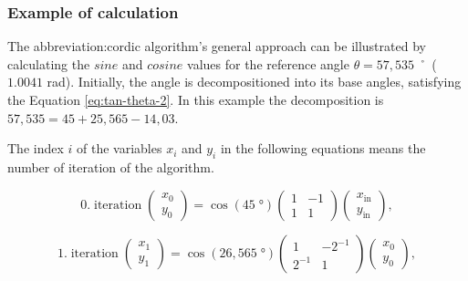 \documentclass[a4paper, twoside, 11pt]{article}
\begin{document}
        \subsubsection{Example of calculation}\label{subsubsec:example-of-calculation}
            The \gls{abbreviation:cordic} algorithm's general approach can be illustrated by calculating the $sine$ and $cosine$ values for the reference angle $\theta = 57,535\;˚$ ($1.0041$ rad). Initially, the angle is decompositioned into its base angles, satisfying the Equation \ref{eq:tan-theta-2}. In this example the decomposition is $57,535 = 45 + 25,565 -14,03$.\par
            The index $i$ of the variables $x_i$ and $y_i$ in the following equations means the number of iteration of the algorithm.

            \begin{equation}
                0.\;\text{iteration}\;
                \begin{pmatrix}
                    x_0\\y_0
                \end{pmatrix}
                =
                \cos (45\;°)
                \begin{pmatrix}
                    1 & -1\\
                    1 & 1
                \end{pmatrix}
                \begin{pmatrix}
                    x_\text{in}\\
                    y_\text{in}
                \end{pmatrix},
            \end{equation}

            
            \begin{equation}
                1.\;\text{iteration}\;
                \begin{pmatrix}
                    x_1\\y_1
                \end{pmatrix}
                =
                \cos (26,565\;°)
                \begin{pmatrix}
                    1 & -2^{-1}\\
                    2^{-1} & 1
                \end{pmatrix}
                \begin{pmatrix}
                    x_0\\
                    y_0
                \end{pmatrix},
            \end{equation}
\end{document}
